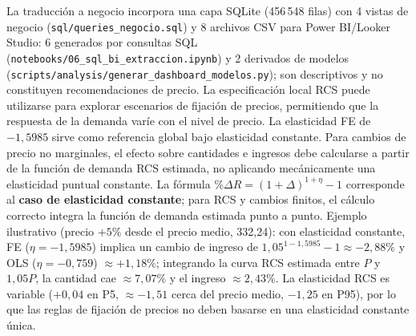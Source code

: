 \documentclass[doc, a4paper, biblatex, floatsintext, longtable, babel]{apa7}
\begin{document}
La traducción a negocio incorpora una capa SQLite (456\,548 filas) con 4 vistas de negocio (\texttt{sql/queries\_negocio.sql}) y 8 archivos CSV para Power BI/Looker Studio: 6 generados por consultas SQL (\texttt{notebooks/06\_sql\_bi\_extraccion.ipynb}) y 2 derivados de modelos (\texttt{scripts/analysis/generar\_dashboard\_modelos.py}); son descriptivos y no constituyen recomendaciones de precio. La especificación local RCS puede utilizarse para explorar escenarios de fijación de precios, permitiendo que la respuesta de la demanda varíe con el nivel de precio. La elasticidad FE de $-1,5985$ sirve como referencia global bajo elasticidad constante. Para cambios de precio no marginales, el efecto sobre cantidades e ingresos debe calcularse a partir de la función de demanda RCS estimada, no aplicando mecánicamente una elasticidad puntual constante. La fórmula $\%\Delta R = (1+\Delta)^{1+\eta} - 1$ corresponde al \textbf{caso de elasticidad constante}; para RCS y cambios finitos, el cálculo correcto integra la función de demanda estimada punto a punto. Ejemplo ilustrativo (precio $+5\%$ desde el precio medio, 332,24): con elasticidad constante, FE ($\eta=-1,5985$) implica un cambio de ingreso de $1,05^{1-1,5985}-1 \approx -2,88\%$ y OLS ($\eta=-0,759$) $\approx +1,18\%$; integrando la curva RCS estimada entre $P$ y $1,05P$, la cantidad cae $\approx 7,07\%$ y el ingreso $\approx 2,43\%$. La elasticidad RCS es variable ($+0,04$ en P5, $\approx -1,51$ cerca del precio medio, $-1,25$ en P95), por lo que las reglas de fijación de precios no deben basarse en una elasticidad constante única.
\end{document}

